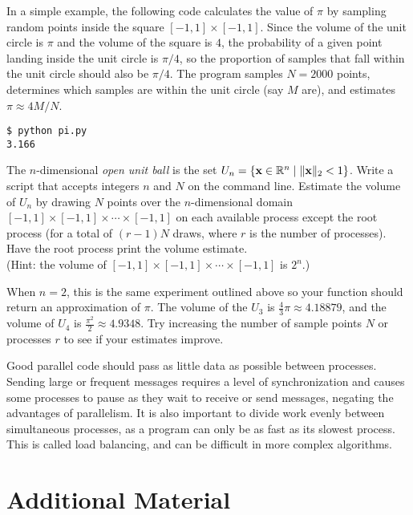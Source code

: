 In a simple example, the following code calculates the value of $\pi$ by sampling random points inside the square $[-1,1]\times[-1,1]$.
Since the volume of the unit circle is $\pi$ and the volume of the square is $4$, the probability of a given point landing inside the unit circle is $\pi/4$, so the proportion of samples that fall within the unit circle should also be $\pi/4$.
The program samples $N = 2000$ points, determines which samples are within the unit circle (say $M$ are), and estimates $\pi\approx 4M/N$.

\begin{lstlisting}
$ python pi.py
3.166
\end{lstlisting}

\begin{problem}
The $n$-dimensional \emph{open unit ball} is the set $U_n = \{\mathbf{x}\in\mathbb{R}^n\mid \|\mathbf{x}\|_2 < 1\}$.
Write a script that accepts integers $n$ and $N$ on the command line.
Estimate the volume of $U_n$ by drawing $N$ points over the $n$-dimensional domain $[-1,1]\times[-1,1]\times\cdots\times[-1,1]$ on each available process except the root process (for a total of $(r-1)N$ draws, where $r$ is the number of processes).
Have the root process print the volume estimate.
\\(Hint: the volume of $[-1,1]\times[-1,1]\times\cdots\times[-1,1]$ is $2^n$.)

When $n=2$, this is the same experiment outlined above so your function should return an approximation of $\pi$.
The volume of the $U_3$ is $\frac{4}{3}\pi \approx 4.18879$, and the volume of $U_4$ is $\frac{\pi^2}{2} \approx 4.9348$.
Try increasing the number of sample points $N$ or processes $r$ to see if your estimates improve.
\end{problem}

\begin{info}
Good parallel code should pass as little data as possible between processes.
Sending large or frequent messages requires a level of synchronization and causes some processes to pause as they wait to receive or send messages, negating the advantages of parallelism.
It is also important to divide work evenly between simultaneous processes, as a program can only be as fast as its slowest process.
This is called load balancing, and can be difficult in more complex algorithms.
\end{info}

\section*{Additional Material} %

